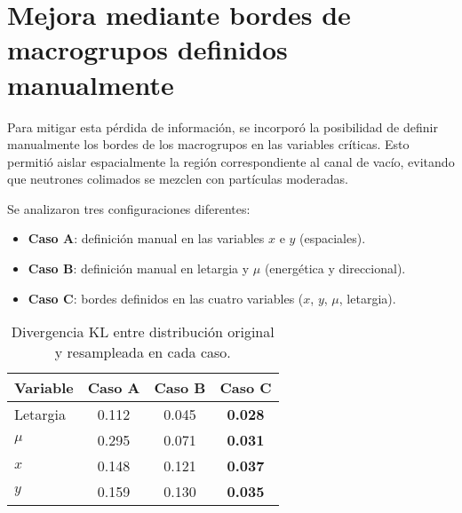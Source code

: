 
\section{Mejora mediante bordes de macrogrupos definidos manualmente}

Para mitigar esta pérdida de información, se incorporó la posibilidad de definir manualmente los bordes de los macrogrupos en las variables críticas. Esto permitió aislar espacialmente la región correspondiente al canal de vacío, evitando que neutrones colimados se mezclen con partículas moderadas.

Se analizaron tres configuraciones diferentes:

\begin{itemize}
    \item \textbf{Caso A}: definición manual en las variables $x$ e $y$ (espaciales).
    \item \textbf{Caso B}: definición manual en letargia y $\mu$ (energética y direccional).
    \item \textbf{Caso C}: bordes definidos en las cuatro variables ($x$, $y$, $\mu$, letargia).
\end{itemize}


\begin{table}[H]
    \centering
    \caption{Divergencia KL entre distribución original y resampleada en cada caso.}
    \label{tab:KL-bordes}
    \begin{tabular}{lccc}
        \toprule
        Variable & Caso A & Caso B & Caso C \\
        \midrule
        Letargia & 0.112 & 0.045 & \textbf{0.028} \\
        $\mu$     & 0.295 & 0.071 & \textbf{0.031} \\
        $x$       & 0.148 & 0.121 & \textbf{0.037} \\
        $y$       & 0.159 & 0.130 & \textbf{0.035} \\
        \bottomrule
    \end{tabular}
\end{table}

